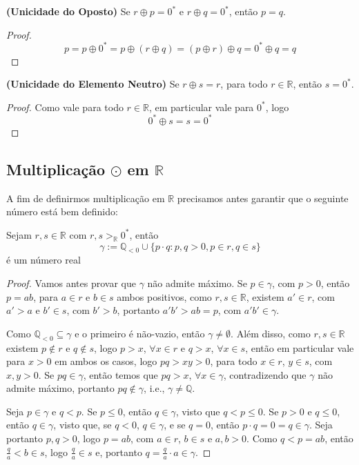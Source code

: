 \documentclass[11pt]{article}
\newcommand{\mbb}[1]{\mathbb{#1}}
\begin{document}
\begin{shaded}
\begin{theorem} \textbf{(Unicidade do Oposto)} Se $r\oplus p=0^*$ e $r\oplus q=0^*$, então $p=q$.
\end{theorem}
\end{shaded}

\begin{proof}
    $$p=p\oplus0^*=p\oplus(r\oplus q)=(p\oplus r)\oplus q=0^*\oplus q=q$$
\end{proof}

\begin{shaded}
\begin{theorem} \textbf{(Unicidade do Elemento Neutro)} Se $r\oplus s=r$, para todo $r\in\mbb{R}$, então $s=0^*$.
\end{theorem}
\end{shaded}

\begin{proof}
    Como vale para todo $r\in\mbb{R}$, em particular vale para $0^*$, logo
    $$0^*\oplus s=s=0^*$$
\end{proof}

\subsection{Multiplicação $\odot$ em $\mbb{R}$}

A fim de definirmos multiplicação em $\mbb{R}$ precisamos antes garantir que o seguinte número está bem definido:

\begin{shaded}
\begin{theorem}
    Sejam $r,s\in\mbb{R}$ com $r,s>_\mbb{R}0^*$, então
    $$\gamma:=\mbb{Q}_{<0}\cup\{p\cdot q:p,q>0, p\in r, q\in s\}$$
    é um número real
\end{theorem}
\end{shaded}

\begin{proof}
    Vamos antes provar que $\gamma$ não admite máximo. Se $p\in\gamma$, com $p>0$, então $p=ab$, para $a\in r$ e $b\in s$ ambos positivos, como $r,s\in\mbb{R}$, existem $a'\in r$, com $a'>a$ e $b'\in s$, com $b'>b$, portanto $a'b'>ab=p$, com $a'b'\in\gamma$.

    Como $\mbb{Q}_{<0}\subseteq\gamma$ e o primeiro é não-vazio, então $\gamma\neq\emptyset$. Além disso, como $r,s\in\mbb{R}$ existem $p\notin r$ e $q\notin s$, logo $p>x$, $\forall x\in r$ e $q>x$, $\forall x\in s$, então em particular vale para $x>0$ em ambos os casos, logo $pq>xy>0$, para todo $x\in r$, $y\in s$, com $x,y>0$. Se $pq\in\gamma$, então temos que $pq>x$, $\forall x\in\gamma$, contradizendo que $\gamma$ não admite máximo, portanto $pq\notin\gamma$, i.e., $\gamma\neq\mbb{Q}$.

    Seja $p\in\gamma$ e $q<p$. Se $p\leq 0$, então $q\in\gamma$, visto que $q<p\leq 0$. Se $p>0$ e $q\leq 0$, então $q\in\gamma$, visto que, se $q<0$, $q\in\gamma$, e se $q=0$, então $p\cdot q=0=q\in\gamma$. Seja portanto $p,q>0$, logo $p=ab$, com $a\in r$, $b\in s$ e $a,b>0$. Como $q<p=ab$, então $\frac{q}{a}<b\in s$, logo $\frac{q}{a}\in s$ e, portanto $q=\frac{q}{a}\cdot a\in\gamma$.
\end{proof}
\end{document}
